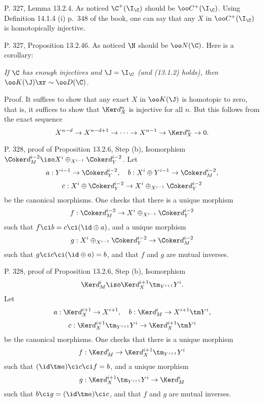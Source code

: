 \documentclass[12pt]{article}
\theoremstyle{remark}
\theoremstyle{definition}
\begin{document}
%

\begin{s}
P. 327, Lemma 13.2.4. As noticed $\C^+(\I_\C)$ should be $\oo C^+(\I_\C)$. Using Definition 14.1.4 (i) p.~348 of the book, one can say that any $X$ in $\oo C^+(\I_\C)$ is homotopically injective.
\end{s}

%

\begin{s}
P. 327, Proposition 13.2.46. As noticed $\N$ should be $\oo N(\C)$. Here is a corollary: 

\nn\emph{If $\C$ has enough injectives and $\J=\I_\C$ (and (13.1.2) holds), then $\oo K(\J)\xr\sim\oo D(\C)$.}

\nn Proof. It suffices to show that any exact $X$ in $\oo K(\J)$ is homotopic to zero, that is, it suffices to show that $\Ker d_X^n$ is injective for all $n$. But this follows from the exact sequence
$$
X^{n-d}\to X^{n-d+1}\to\cdots\to X^{n-1}\to \Ker d_X^n\to0.
$$
\end{s}

%

\begin{s}
P. 328, proof of Proposition 13.2.6, Step (b), Isomorphism $\Coker d_M^{i-2}\iso X^i\oplus_{X^{i-1}}\Coker d_Y^{i-2}$. Let 
$$
a:Y^{i-1}\to\Coker d_Y^{i-2},\quad b:X^i\oplus Y^{i-1}\to\Coker d_M^{i-2},
$$
$$
c:X^i\oplus\Coker d_Y^{i-2}\to X^i\oplus_{X^{i-1}}\Coker d_Y^{i-2}
$$
be the canonical morphisms. One checks that there is a unique morphism 
$$
f:\Coker d_M^{i-2}\to X^i\oplus_{X^{i-1}}\Coker d_Y^{i-2}
$$
such that $f\ci b=c\ci(\id\oplus a)$, and a unique morphism 
$$
g:X^i\oplus_{X^{i-1}}\Coker d_Y^{i-2}\to\Coker d_M^{i-2}
$$
such that $g\ci c\ci(\id\oplus a)=b$, and that $f$ and $g$ are mutual inverses.
\end{s}

%

\begin{s}
P. 328, proof of Proposition 13.2.6, Step (b), Isomorphism $$\Ker d_M^i\iso\Ker d_X^{i+1}\tm_{Y^{i+1}}Y^i.$$ Let 
$$
a:\Ker d_X^{i+1}\to X^{i+1},\quad b:\Ker d_M^i\to X^{i+1}\tm Y^i,
$$
$$
c:\Ker d_X^{i+1}\tm_{Y^{i+1}}Y^i\to\Ker d_X^{i+1}\tm Y^i
$$
be the canonical morphisms. One checks that there is a unique morphism 
$$
f:\Ker d_M^i\to\Ker d_X^{i+1}\tm_{Y^{i+1}}Y^i
$$
such that $(\id\tm a)\ci c\ci f=b$, and a unique morphism 
$$
g:\Ker d_X^{i+1}\tm_{Y^{i+1}}Y^i\to\Ker d_M^i
$$
such that $b\ci g=(\id\tm a)\ci c$, and that $f$ and $g$ are mutual inverses.
\end{s}
\end{document}
